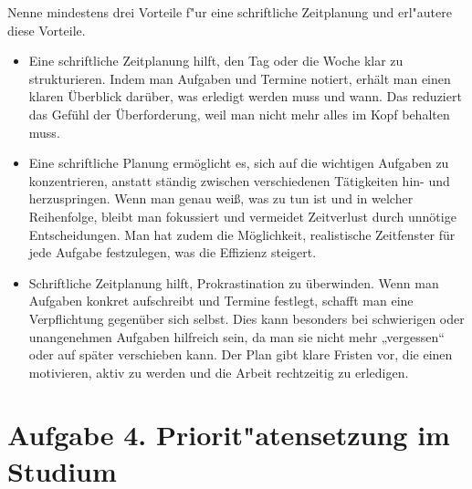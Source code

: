 \documentclass[10pt, oneside]{article}
\begin{document}
Nenne mindestens drei Vorteile f"ur eine schriftliche Zeitplanung und
erl"autere diese Vorteile.

\begin{itemize}
    \item Eine schriftliche Zeitplanung hilft, den Tag oder die Woche klar zu
        strukturieren. Indem man Aufgaben und Termine notiert, erhält man einen
        klaren Überblick darüber, was erledigt werden muss und wann. Das
        reduziert das Gefühl der Überforderung, weil man nicht mehr alles im
        Kopf behalten muss.
    \item Eine schriftliche Planung ermöglicht es, sich auf die wichtigen
        Aufgaben zu konzentrieren, anstatt ständig zwischen verschiedenen
        Tätigkeiten hin- und herzuspringen. Wenn man genau weiß, was zu tun ist
        und in welcher Reihenfolge, bleibt man fokussiert und vermeidet
        Zeitverlust durch unnötige Entscheidungen. Man hat zudem die
        Möglichkeit, realistische Zeitfenster für jede Aufgabe festzulegen, was
        die Effizienz steigert.
    \item Schriftliche Zeitplanung hilft, Prokrastination zu
        überwinden. Wenn man Aufgaben konkret aufschreibt und Termine festlegt,
        schafft man eine Verpflichtung gegenüber sich selbst. Dies kann
        besonders bei schwierigen oder unangenehmen Aufgaben hilfreich sein, da
        man sie nicht mehr „vergessen“ oder auf später verschieben kann. Der
        Plan gibt klare Fristen vor, die einen motivieren, aktiv zu werden und
        die Arbeit rechtzeitig zu erledigen.
\end{itemize}

\section{Aufgabe 4. Priorit"atensetzung im Studium}
\end{document}
